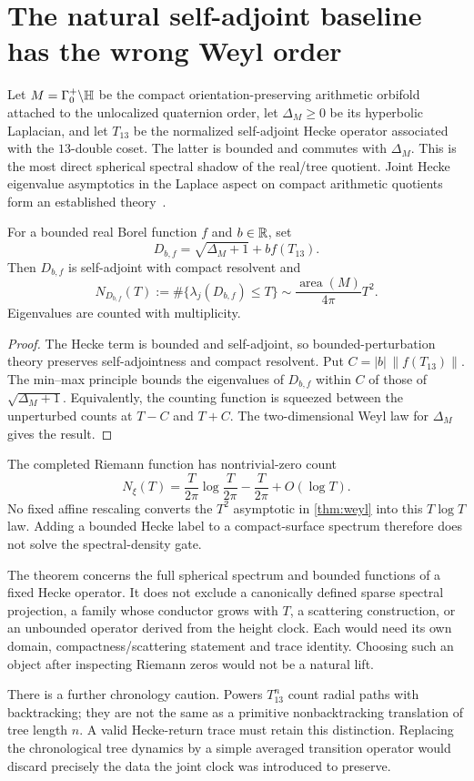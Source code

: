 \section{The natural self-adjoint baseline has the wrong Weyl order}

Let $M=\Gamma_0^+\backslash\mathbb{H}$ be the compact orientation-preserving
arithmetic orbifold attached to the unlocalized quaternion order, let
$\Delta_M\ge0$ be its hyperbolic Laplacian, and let $T_{13}$ be the
normalized self-adjoint Hecke operator associated with the $13$-double
coset.  The latter is bounded and commutes with $\Delta_M$.  This is the
most direct spherical spectral shadow of the real/tree quotient.  Joint
Hecke eigenvalue asymptotics in the Laplace aspect on compact arithmetic
quotients form an established theory~\cite{RamacherWakatsuki2022}.

\begin{theorem}\label{thm:weyl}
For a bounded real Borel function $f$ and $b\in\mathbb{R}$, set
\[
D_{b,f}=\sqrt{\Delta_M+1}+b f(T_{13}).
\]
Then $D_{b,f}$ is self-adjoint with compact resolvent and
\[
N_{D_{b,f}}(T):=\#\{\lambda_j(D_{b,f})\le T\}
\sim\frac{\operatorname{area}(M)}{4\pi}T^2.
\]
Eigenvalues are counted with multiplicity.
\end{theorem}

\begin{proof}
The Hecke term is bounded and self-adjoint, so bounded-perturbation theory
preserves self-adjointness and compact resolvent.  Put
$C=|b|\,\lVert f(T_{13})\rVert$.  The min--max principle bounds the
eigenvalues of $D_{b,f}$ within $C$ of those of
$\sqrt{\Delta_M+1}$.  Equivalently, the counting function is squeezed
between the unperturbed counts at $T-C$ and $T+C$.  The two-dimensional Weyl
law for $\Delta_M$ gives the result.
\end{proof}

The completed Riemann function has nontrivial-zero count
\[
N_\xi(T)=\frac{T}{2\pi}\log\frac{T}{2\pi}
-\frac{T}{2\pi}+O(\log T).
\]
No fixed affine rescaling converts the $T^2$ asymptotic in
\cref{thm:weyl} into this $T\log T$ law.  Adding a bounded Hecke label to a
compact-surface spectrum therefore does not solve the spectral-density gate.

\begin{remark}
The theorem concerns the full spherical spectrum and bounded functions of a
fixed Hecke operator.  It does not exclude a canonically defined sparse
spectral projection, a family whose conductor grows with $T$, a scattering
construction, or an unbounded operator derived from the height clock.  Each
would need its own domain, compactness/scattering statement and trace
identity.  Choosing such an object after inspecting Riemann zeros would not
be a natural lift.
\end{remark}

There is a further chronology caution.  Powers $T_{13}^n$ count radial paths
with backtracking; they are not the same as a primitive nonbacktracking
translation of tree length $n$.  A valid Hecke-return trace must retain this
distinction.  Replacing the chronological tree dynamics by a simple averaged
transition operator would discard precisely the data the joint clock was
introduced to preserve.
